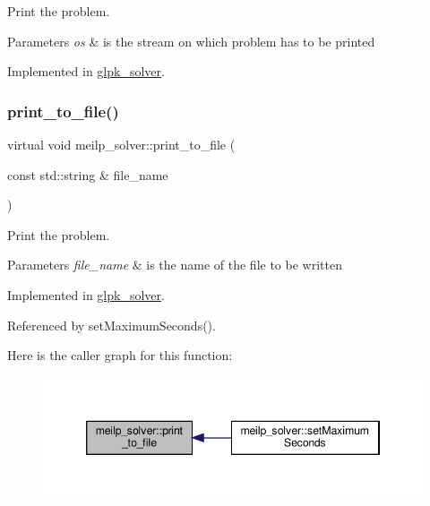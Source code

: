 Print the problem. 


\begin{DoxyParams}{Parameters}
{\em os} & is the stream on which problem has to be printed \\
\hline
\end{DoxyParams}


Implemented in \hyperlink{classglpk__solver_a0a3f1dcdb065e42d04a45a6cd6864b90}{glpk\+\_\+solver}.

\mbox{\label{classmeilp__solver_af9f40eca7fda0fae7436fe7a24c589b7}} 
\subsubsection{\texorpdfstring{print\+\_\+to\+\_\+file()}{print\_to\_file()}}
{\footnotesize\ttfamily virtual void meilp\+\_\+solver\+::print\+\_\+to\+\_\+file (\begin{DoxyParamCaption}\item[{const std\+::string \&}]{file\+\_\+name }\end{DoxyParamCaption})\hspace{0.3cm}{\ttfamily [pure virtual]}}



Print the problem. 


\begin{DoxyParams}{Parameters}
{\em file\+\_\+name} & is the name of the file to be written \\
\hline
\end{DoxyParams}


Implemented in \hyperlink{classglpk__solver_aaee0e321445ea081d26952772e4e2eef}{glpk\+\_\+solver}.



Referenced by set\+Maximum\+Seconds().

Here is the caller graph for this function\+:
\nopagebreak
\begin{figure}[H]
\begin{center}
\leavevmode
\includegraphics[width=346pt]{dc/d7f/classmeilp__solver_af9f40eca7fda0fae7436fe7a24c589b7_icgraph}
\end{center}
\end{figure}
\mbox{\label{classmeilp__solver_a4c58b5afa4d7061540b8cb93213b8154}} 
